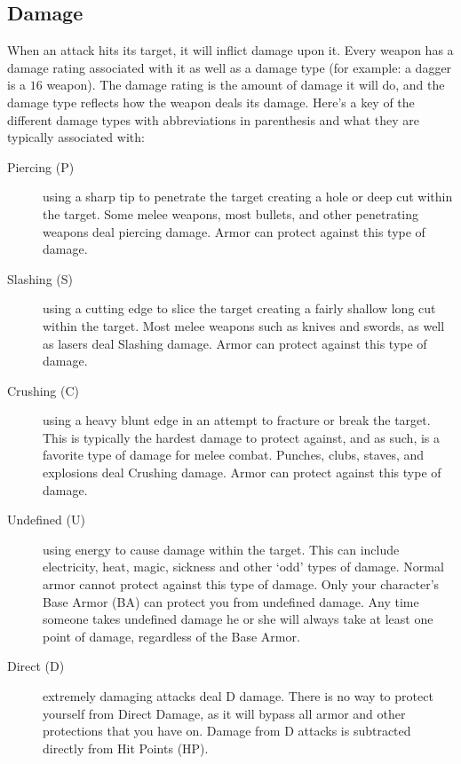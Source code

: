\documentclass[twoside]{book}
\begin{document}
\subsection{Damage}
     When an attack hits its target, it will inflict
               damage upon it. Every weapon has a damage rating
               associated with it as well as a damage type (for example:
               a dagger is a \ensuremath{1}\ensuremath{6}\ensuremath{} weapon). The damage rating is the
               amount of damage it will do, and the damage type reflects
               how the weapon deals its damage.  Here's a key of the different damage types
               with abbreviations in parenthesis and what they are
               typically associated with: 
\begin{description}
    
  \item[ Piercing (P) ]   using a sharp tip to penetrate the target
                   creating a hole or deep cut within the target. Some
                   melee weapons, most bullets, and other penetrating
                   weapons deal piercing damage. Armor can protect
                   against this type of damage. 
  \item[ Slashing (S) ]   using a cutting edge to slice the target
                   creating a fairly shallow long cut within the target.
                   Most melee weapons such as knives and swords, as well
                   as lasers deal Slashing damage. Armor can protect
                   against this type of damage. 
  \item[ Crushing (C) ]   using a heavy blunt edge in an attempt to
                   fracture or break the target. This is typically the
                   hardest damage to protect against, and as such, is a
                   favorite type of damage for melee combat. Punches,
                   clubs, staves, and explosions deal Crushing damage.
                   Armor can protect against this type of damage. 
  \item[ Undefined (U) ]   using energy to cause damage within the target.
                   This can include electricity, heat, magic, sickness
                   and other `odd' types of damage. Normal
                   armor cannot protect against this type of damage. Only
                   your character's Base Armor (BA) can protect you
                   from undefined damage. Any time someone takes
                   undefined damage he or she will always take at least
                   one point of damage, regardless of the Base Armor.
                   
  \item[ Direct (D) ]   extremely damaging attacks deal D damage. There
                   is no way to protect yourself from Direct Damage, as
                   it will bypass all armor and other protections that
                   you have on. Damage from D attacks is subtracted
                   directly from Hit Points (HP). 
\end{description}
\end{document}
